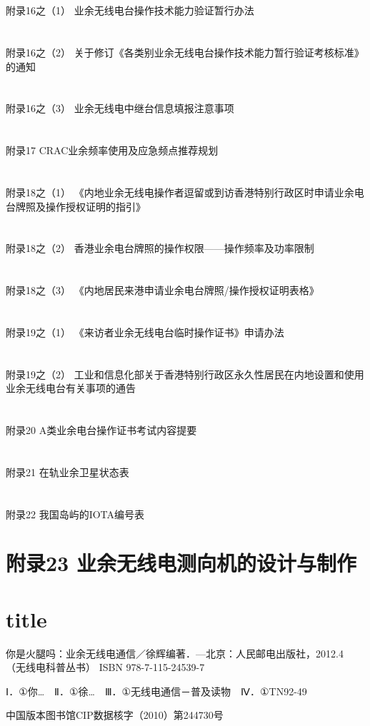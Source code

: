 \documentclass[12pt,UTF8]{ctexbook}
\begin{document}
\section{}附录16之（1） 业余无线电台操作技术能力验证暂行办法
\section{}附录16之（2） 关于修订《各类别业余无线电台操作技术能力暂行验证考核标准》的通知
\section{}附录16之（3） 业余无线电中继台信息填报注意事项
\section{}附录17 CRAC业余频率使用及应急频点推荐规划
\section{}附录18之（1） 《内地业余无线电操作者逗留或到访香港特别行政区时申请业余电台牌照及操作授权证明的指引》
\section{}附录18之（2） 香港业余电台牌照的操作权限——操作频率及功率限制
\section{}附录18之（3） 《内地居民来港申请业余电台牌照/操作授权证明表格》
\section{}附录19之（1） 《来访者业余无线电台临时操作证书》申请办法
\section{}附录19之（2） 工业和信息化部关于香港特别行政区永久性居民在内地设置和使用业余无线电台有关事项的通告
\section{}附录20 A类业余电台操作证书考试内容提要
\section{}附录21 在轨业余卫星状态表
\section{}附录22 我国岛屿的IOTA编号表

\section{附录23 业余无线电测向机的设计与制作}




\section{title}

你是火腿吗：业余无线电通信／徐辉编著．—北京：人民邮电出版社，2012.4
（无线电科普丛书）
ISBN 978-7-115-24539-7

Ⅰ．①你…　Ⅱ．①徐…　Ⅲ．①无线电通信－普及读物　Ⅳ．①TN92-49

中国版本图书馆CIP数据核字（2010）第244730号
\end{document}
